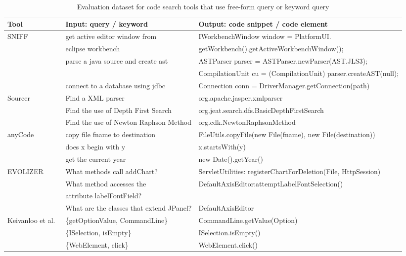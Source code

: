 \begin{table*}[ht]
\begin{center}
\caption{Evaluation dataset for code search tools that use free-form query or keyword query}
\label{tab:total}
\vspace{1mm}
\scriptsize{
\begin{tabular*}{1\textwidth}{@{}l|l|l@{}} \hline
Tool&Input: query / keyword&Output: code snippet / code element\\\hline
SNIFF~\cite{sniff:Sen09}&get active editor window from&IWorkbenchWindow window = PlatformUI.\\
& eclipse workbench&getWorkbench().getActiveWorkbenchWindow();\\
&parse a java source and create ast&ASTParser parser = ASTParser.newParser(AST.JLS3);\\
&&CompilationUnit cu = (CompilationUnit) parser.createAST(null);\\
&connect to a database using jdbc&Connection conn = DriverManager.getConnection(path)\\ \hline
Sourcer~\cite{Sourcerer:SC14}&Find a XML parser&org.apache.jasper.xmlparser\\
&Find the use of Depth First Search&org.jeat.search.dfs.BasicDepthFirstSearch\\
&Find the use of Newton Raphson Method&org.cdk.NewtonRaphsonMethod\\ \hline
anyCode~\cite{Gvero:ICSE15}&copy file fname to destination&FileUtils.copyFile(new File(fname), new File(destination))\\
&does x begin with y&x.startsWith(y)\\
&get the current year&new Date().getYear()\\ \hline
EVOLIZER~\cite{gall:nlQueryICSE10}&What methods call addChart?&ServletUtilities: registerChartForDeletion(File, HttpSession)\\
&What method accesses the&DefaultAxisEditor:attemptLabelFontSelection()\\
& attribute labelFontField?\\
&What are the classes that extend JPanel?&DefaultAxisEditor \\ \hline
Keivanloo et al.~\cite{spotWork:ICSE14}&\{getOptionValue, CommandLine\}&CommandLine.getValue(Option)\\
&\{ISelection, isEmpty\}&ISelection.isEmpty()\\
&\{WebElement, click\}&WebElement.click() \\\hline
\end{tabular*}
 \label{tab:freeform}
}
 \end{center}
\end{table*}

